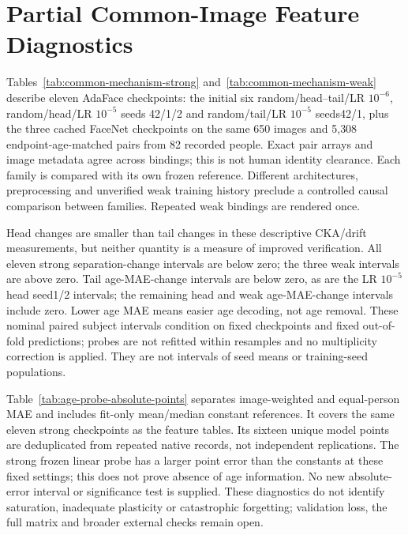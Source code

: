 \documentclass[journal]{IEEEtran}
\begin{document}
\section{Partial Common-Image Feature Diagnostics}\label{sec:common-image-feature-diagnostics}
Tables~\ref{tab:common-mechanism-strong} and~\ref{tab:common-mechanism-weak}
describe eleven AdaFace checkpoints: the initial six random/head--tail/LR $10^{-6}$,
random/head/LR $10^{-5}$ seeds 42/1/2 and random/tail/LR $10^{-5}$ seeds42/1, plus
the three cached FaceNet checkpoints on the same 650 images and 5{,}308
endpoint-age-matched pairs from 82 recorded people. Exact pair arrays and
image metadata agree across bindings; this is not human identity clearance.
Each family is compared with its own frozen reference. Different architectures,
preprocessing and unverified weak training history preclude a controlled causal
comparison between families. Repeated weak bindings are rendered once.

Head changes are smaller than tail changes in these descriptive CKA/drift
measurements, but neither quantity is a measure of improved verification.
All eleven strong separation-change intervals are below zero; the three weak
intervals are above zero. Tail age-MAE-change intervals are below zero,
as are the LR $10^{-5}$ head seed1/2 intervals; the remaining head and weak
age-MAE-change intervals include zero. Lower age MAE
means easier age decoding, not age removal. These nominal paired subject
intervals condition on fixed checkpoints and fixed out-of-fold predictions;
probes are not refitted within resamples and no multiplicity correction is
applied. They are not intervals of seed means or training-seed populations.

Table~\ref{tab:age-probe-absolute-points} separates image-weighted and
equal-person MAE and includes fit-only mean/median constant references.
It covers the same eleven strong checkpoints as the feature tables.
Its sixteen unique model points are deduplicated from repeated native records,
not independent replications. The strong frozen linear probe has a larger
point error than the constants at these fixed settings; this does not prove
absence of age information. No new absolute-error interval or significance
test is supplied. These diagnostics do not identify saturation, inadequate
plasticity or catastrophic forgetting; validation loss, the full matrix and
broader external checks remain open.
\end{document}
